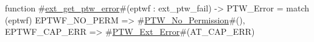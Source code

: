 function #\hyperref[sailRISCVzextzygetzyptwzyerror]{ext\_get\_ptw\_error}#(eptwf : ext_ptw_fail) -> PTW_Error =
  match (eptwf) {
    EPTWF_NO_PERM  => #\hyperref[sailRISCVzPTWzyNozyPermission]{PTW\_No\_Permission}#(),
    EPTWF_CAP_ERR  => #\hyperref[sailRISCVzPTWzyExtzyError]{PTW\_Ext\_Error}#(AT_CAP_ERR)
  }

